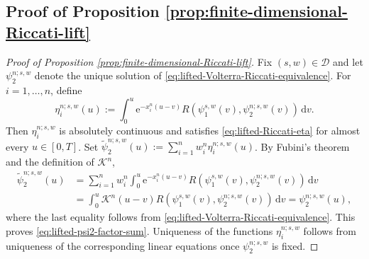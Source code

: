 \documentclass[10pt,a4paper,reqno]{amsart}
\theoremstyle{plain}
\theoremstyle{definition}
\theoremstyle{remark}
\theoremstyle{example}
\begin{document}
\subsection{Proof of Proposition \ref{prop:finite-dimensional-Riccati-lift}}\label{sec:proof-finite-dimensional-Riccati-lift}


\begin{proof}[Proof of Proposition \ref{prop:finite-dimensional-Riccati-lift}]
Fix $(s,w)\in\mathcal D$ and let $\psi_2^{n;s,w}$ denote the unique solution of
\eqref{eq:lifted-Volterra-Riccati-equivalence}. For $i=1,\dots,n$, define 
\[
    \eta_i^{n;s,w}(u) := \int_0^u \mathrm e^{-x_i^n(u-v)} R\left( \psi_1^{s,w}(v), \psi_2^{n;s,w}(v) \right)\,\mathrm dv .
\]
Then $\eta_i^{n;s,w}$ is absolutely continuous and satisfies \eqref{eq:lifted-Riccati-eta} for almost every $u\in[0,T]$. Set $\widetilde\psi_2^{n;s,w}(u) := \sum_{i=1}^n w_i^n\eta_i^{n;s,w}(u)$. By Fubini's theorem and the definition of $\mathcal K^n$,
\begin{align*}
\widetilde\psi_2^{n;s,w}(u) &= \sum_{i=1}^n w_i^n \int_0^u \mathrm e^{-x_i^n(u-v)} R\left( \psi_1^{s,w}(v), \psi_2^{n;s,w}(v) \right)\,\mathrm dv 
\\ &= \int_0^u \mathcal K^n(u-v) R\left( \psi_1^{s,w}(v), \psi_2^{n;s,w}(v) \right)\,\mathrm dv
= \psi_2^{n;s,w}(u),
\end{align*}
where the last equality follows from \eqref{eq:lifted-Volterra-Riccati-equivalence}. This proves
\eqref{eq:lifted-psi2-factor-sum}. Uniqueness of the functions $\eta_i^{n;s,w}$ follows from uniqueness of the corresponding linear equations once $\psi_2^{n;s,w}$ is fixed.


\end{proof}
\end{document}
